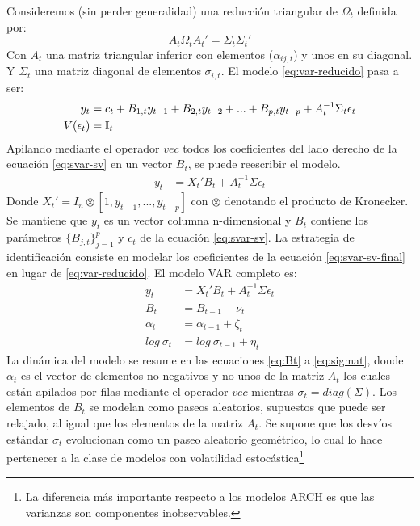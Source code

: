 \documentclass[12pt,oneside]{reedthesis}
\begin{document}
Consideremos (sin perder generalidad) una reducción triangular de \(\Omega_t\) definida por:
\begin{equation}
A_t\Omega_tA_t' = \Sigma_t\Sigma_t'
\end{equation}
Con \(A_t\) una matriz triangular inferior con elementos (\(\alpha_{ij,t}\)) y unos en su diagonal. Y \(\Sigma_t\) una matriz diagonal de elementos \(\sigma_{i, t}\). El modelo \eqref{eq:var-reducido} pasa a ser:
\begin{align}
y_t &= c_t + B_{1,t}y_{t-1} + B_{2,t}y_{t-2} + ... + B_{p,t}y_{t-p} + A_t^{-1}\Sigma_t\epsilon_t \label{eq:svar-sv} \\
V(\epsilon_t) &= \mathbb{I}_t \notag
\end{align}
Apilando mediante el operador \(vec\) todos los coeficientes del lado derecho de la ecuación \eqref{eq:svar-sv} en un vector \(B_t\), se puede reescribir el modelo.
\begin{align}
y_t  &= X_t'B_t + A_t^{-1}\Sigma \epsilon_t \label{eq:svar-sv-final}
\end{align}
Donde \(X_t' = I_n \otimes [1, y_{t-1}, ..., y_{t-p}]\) con \(\otimes\) denotando el producto de Kronecker. Se mantiene que \(y_t\) es un vector columna n-dimensional y \(B_t\) contiene los parámetros \(\{B_{j,t}\}_{j=1}^p\) y \(c_t\) de la ecuación \eqref{eq:svar-sv}.
La estrategia de identificación consiste en modelar los coeficientes de la ecuación \eqref{eq:svar-sv-final} en lugar de \eqref{eq:var-reducido}. El modelo VAR completo es:
\begin{align}
y_t  &= X_t'B_t + A_t^{-1}\Sigma\epsilon_t \label{eq:yt}\\
B_t &= B_{t-1} + \nu_t \label{eq:Bt}\\
\alpha_t &= \alpha_{t-1} + \zeta_t \label{eq:alphat}\\
log \ \sigma_t &= log \ \sigma_{t-1} + \eta_t \label{eq:sigmat}
\end{align}
La dinámica del modelo se resume en las ecuaciones \eqref{eq:Bt} a \eqref{eq:sigmat}, donde \(\alpha_t\) es el vector de elementos no negativos y no unos de la matriz \(A_t\) los cuales están apilados por filas mediante el operador \(vec\) mientras \(\sigma_t = diag(\Sigma)\). Los elementos de \(B_t\) se modelan como paseos aleatorios, supuestos que puede ser relajado, al igual que los elementos de la matriz \(A_t\). Se supone que los desvíos estándar \(\sigma_t\) evolucionan como un paseo aleatorio geométrico, lo cual lo hace pertenecer a la clase de modelos con volatilidad estocástica\footnote{La diferencia más importante respecto a los modelos ARCH es que las varianzas son componentes inobservables.}
\end{document}
